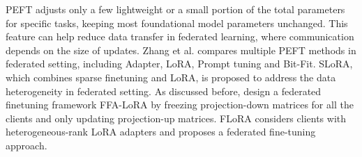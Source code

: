 PEFT adjusts only a few lightweight or a small portion of the total parameters for specific tasks, keeping most foundational model parameters unchanged. This feature can help reduce data transfer in federated learning, where communication depends on the size of updates. Zhang et al. \cite{zhang-etal-2023-fedpetuning} compares multiple PEFT methods in federated setting, including Adapter\cite{houlsby2019parameterefficient}, LoRA\cite{hu2021lora}, Prompt tuning\cite{liu2022ptuning} and Bit-Fit\cite{zaken2022bitfit}. SLoRA\cite{babakniya2023slora}, which combines sparse finetuning and LoRA, is proposed to address the data heterogeneity in federated setting. 
As discussed before, \cite{sun2024improving} design a federated finetuning framework FFA-LoRA by freezing projection-down matrices for all the clients and only updating projection-up matrices. %
FLoRA \cite{wang2024florafederatedfinetuninglarge} considers clients with heterogeneous-rank LoRA adapters and proposes a federated fine-tuning approach.